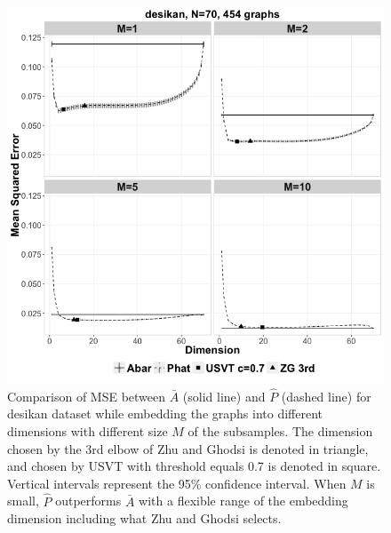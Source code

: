 \documentclass[a4paper]{article}
\begin{document}
\begin{figure}[!htb]
\centering
\includegraphics[width=1\textwidth]{desikan.png}
\caption{Comparison of MSE between $\bar{A}$ (solid line) and $\hat{P}$ (dashed line) for desikan dataset while embedding the graphs into different dimensions with different size $M$ of the subsamples. The dimension chosen by the 3rd elbow of Zhu and Ghodsi is denoted in triangle, and chosen by USVT with threshold equals 0.7 is denoted in square.  Vertical intervals represent the 95\% confidence interval.  When $M$ is small, $\hat{P}$ outperforms $\bar{A}$ with a flexible range of the embedding dimension including what Zhu and Ghodsi selects.}
\label{fig:desikan}
\end{figure}
\end{document}
